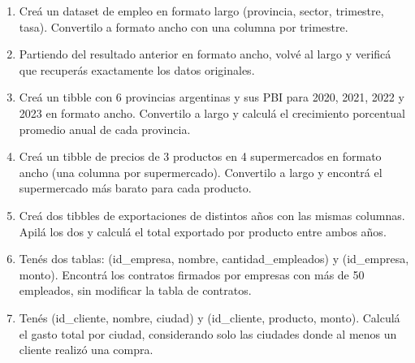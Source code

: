 \documentclass[8pt]{beamer}
\begin{document}
	\begin{frame}[fragile]
		\begin{enumerate}[start=15]
			\item Creá un dataset de empleo en formato largo (provincia, sector, trimestre, tasa). Convertilo a formato ancho con una columna por trimestre.

			\item Partiendo del resultado anterior en formato ancho, volvé al largo y verificá que recuperás exactamente los datos originales.

			\item Creá un tibble con 6 provincias argentinas y sus PBI para 2020, 2021, 2022 y 2023 en formato ancho. Convertilo a largo y calculá el crecimiento porcentual promedio anual de cada provincia.

			\item Creá un tibble de precios de 3 productos en 4 supermercados en formato ancho (una columna por supermercado). Convertilo a largo y encontrá el supermercado más barato para cada producto.

			\item Creá dos tibbles de exportaciones de distintos años con las mismas columnas. Apilá los dos y calculá el total exportado por producto entre ambos años.

			\item Tenés dos tablas:  (id\_empresa, nombre, cantidad\_empleados) y  (id\_empresa, monto). Encontrá los contratos firmados por empresas con más de 50 empleados, sin modificar la tabla de contratos.

			\item Tenés  (id\_cliente, nombre, ciudad) y  (id\_cliente, producto, monto). Calculá el gasto total por ciudad, considerando solo las ciudades donde al menos un cliente realizó una compra.
		\end{enumerate}
	\end{frame}
\end{document}
